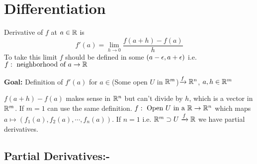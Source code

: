 \chapter{Differentiation }
Derivative of $f$ at $a\in \mathbb{R}$ is $$f'(a)=\lim_{h\to 0} \frac{f(a+h)-f(a)}{h}$$To take this limit $f$ should be defined in some $(a-\epsilon,a+\epsilon)$ i.e. $f:\text{ neighborhood of }a\to\mathbb{R}$\parinf

\textbf{Goal:} Definition of $f'(a)$ for $a\in $(Some open $U$ in $\mathbb{R}^m$)$\xrightarrow{f}\mathbb{R}^n$, $a,h\in\mathbb{R}^m$\parinn

$f(a+h)-f(a)$ makes sense in $\mathbb{R}^n$ but can't divide by $h$, which is a vector in $\mathbb{R}^m$. If $m=1$ can use the same definition. ${f:\text{ Open }U\text{ in a }\mathbb{R}\to\mathbb{R}^n}$ which maps $a\mapsto(f_1(a),f_2(a),\cdots,f_n(a))$. If $n=1$ i.e. $\mathbb{R}^m\supset U\xrightarrow{f}\mathbb{R}$  we have partial derivatives.
\section{Partial Derivatives:-}

